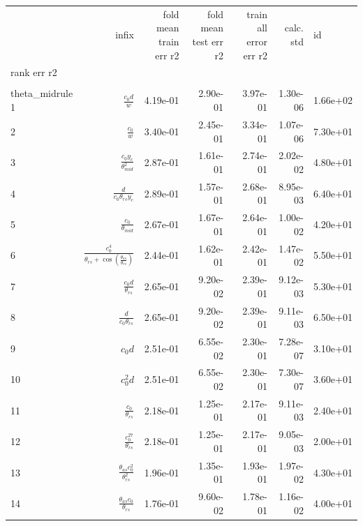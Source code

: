 \begin{tabularx}{\textwidth}{lRRRRRl}
\toprule
  &  infix  &  fold mean train err r2  &  fold mean test err r2  &  train all error err r2  &  calc. std  &  id  \\ 
rank err r2  &    &    &    &    &    &    \\ 
\\theta_{mid}rule
1  &  $ \displaystyle\frac{c_{0} d}{w} $  &  4.19e-01  &  2.90e-01  &  3.97e-01  &  1.30e-06  &  1.66e+02  \\ 
2  &  $ \displaystyle\frac{c_{0}}{w} $  &  3.40e-01  &  2.45e-01  &  3.34e-01  &  1.07e-06  &  7.30e+01  \\ 
3  &  $ \displaystyle\frac{c_{0} y_c}{\theta_{mid}^{2}} $  &  2.87e-01  &  1.61e-01  &  2.74e-01  &  2.02e-02  &  4.80e+01  \\ 
4  &  $ \displaystyle\frac{d}{c_{0} \theta_{rs} y_c} $  &  2.89e-01  &  1.57e-01  &  2.68e-01  &  8.95e-03  &  6.40e+01  \\ 
5  &  $ \displaystyle\frac{c_{0}}{\theta_{mid}} $  &  2.67e-01  &  1.67e-01  &  2.64e-01  &  1.00e-02  &  4.20e+01  \\ 
6  &  $ \displaystyle\frac{c_{0}^{4}}{\theta_{rs} + \cos{\left(\displaystyle\frac{\theta_{as}}{\theta_{rs}} \right)}} $  &  2.44e-01  &  1.62e-01  &  2.42e-01  &  1.47e-02  &  5.50e+01  \\ 
7  &  $ \displaystyle\frac{c_{0} d}{\theta_{rs}} $  &  2.65e-01  &  9.20e-02  &  2.39e-01  &  9.12e-03  &  5.30e+01  \\ 
8  &  $ \displaystyle\frac{d}{c_{0} \theta_{rs}} $  &  2.65e-01  &  9.20e-02  &  2.39e-01  &  9.11e-03  &  6.50e+01  \\ 
9  &  $ c_{0} d $  &  2.51e-01  &  6.55e-02  &  2.30e-01  &  7.28e-07  &  3.10e+01  \\ 
10  &  $ c_{0}^{2} d $  &  2.51e-01  &  6.55e-02  &  2.30e-01  &  7.30e-07  &  3.60e+01  \\ 
11  &  $ \displaystyle\frac{c_{0}}{\theta_{rs}} $  &  2.18e-01  &  1.25e-01  &  2.17e-01  &  9.11e-03  &  2.40e+01  \\ 
12  &  $ \displaystyle\frac{c_{0}^{27}}{\theta_{rs}} $  &  2.18e-01  &  1.25e-01  &  2.17e-01  &  9.05e-03  &  2.00e+01  \\ 
13  &  $ \displaystyle\frac{\theta_{as} c_{0}^{2}}{\theta_{rs}^{2}} $  &  1.96e-01  &  1.35e-01  &  1.93e-01  &  1.97e-02  &  4.30e+01  \\ 
14  &  $ \displaystyle\frac{\theta_{as} c_{0}}{\theta_{rs}} $  &  1.76e-01  &  9.60e-02  &  1.78e-01  &  1.16e-02  &  4.00e+01  \\ 

\end{tabularx}
